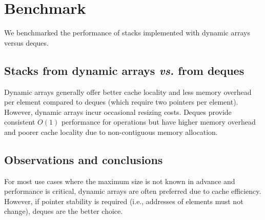 \section{Benchmark}

We benchmarked the performance of stacks implemented with dynamic arrays versus deques.

\subsection{Stacks from dynamic arrays \textit{vs.} from deques}

Dynamic arrays generally offer better cache locality and less memory overhead per element compared to deques (which require two pointers per element). However, dynamic arrays incur occasional resizing costs. Deques provide consistent $O(1)$ performance for operations but have higher memory overhead and poorer cache locality due to non-contiguous memory allocation.

\subsection{Observations and conclusions}

For most use cases where the maximum size is not known in advance and performance is critical, dynamic arrays are often preferred due to cache efficiency. However, if pointer stability is required (i.e., addresses of elements must not change), deques are the better choice.
